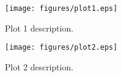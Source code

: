 \begin{figure}[h!]
\centering
    \texttt{[image: figures/plot1.eps]}
    \caption{Plot 1 description.}
    \label{fig:Plot1}  
\end{figure}

\begin{figure}[h!]
\centering
    \texttt{[image: figures/plot2.eps]}
    \caption{Plot 2 description.}
    \label{fig:Plot2}  
\end{figure}
